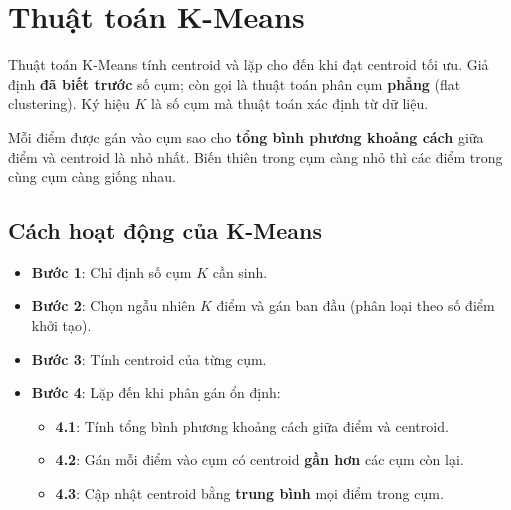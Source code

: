 \section{Thuật toán K-Means}
\label{sec:k-means}

\begin{dinhnghia}[title={K-Means Clustering}]
Thuật toán K-Means tính centroid và lặp cho đến khi đạt centroid tối ưu. Giả định \textbf{đã biết trước} số cụm; còn gọi là thuật toán phân cụm \textbf{phẳng} (flat clustering). Ký hiệu $K$ là số cụm mà thuật toán xác định từ dữ liệu.
\end{dinhnghia}

\begin{ynghia}[title={target tối thiểu}]
Mỗi điểm được gán vào cụm sao cho \textbf{tổng bình phương khoảng cách} giữa điểm và centroid là nhỏ nhất. Biến thiên trong cụm càng nhỏ thì các điểm trong cùng cụm càng giống nhau.
\end{ynghia}

\subsection{Cách hoạt động của K-Means}

\begin{phuongphap}[title={Các bước}]
\begin{itemize}
  \item \textbf{Bước 1}: Chỉ định số cụm $K$ cần sinh.
  \item \textbf{Bước 2}: Chọn ngẫu nhiên $K$ điểm và gán ban đầu (phân loại theo số điểm khởi tạo).
  \item \textbf{Bước 3}: Tính centroid của từng cụm.
  \item \textbf{Bước 4}: Lặp đến khi phân gán ổn định:
  \begin{itemize}
    \item \textbf{4.1}: Tính tổng bình phương khoảng cách giữa điểm và centroid.
    \item \textbf{4.2}: Gán mỗi điểm vào cụm có centroid \textbf{gần hơn} các cụm còn lại.
    \item \textbf{4.3}: Cập nhật centroid bằng \textbf{trung bình} mọi điểm trong cụm.
  \end{itemize}
\end{itemize}
\end{phuongphap}

